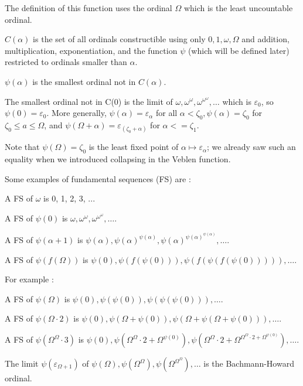 \documentclass[10pt]{article}
\begin{document}
The definition of this function uses the ordinal \( \Omega \) which is the least uncountable ordinal. 

\( C(\alpha) \) is the set of all ordinals constructible using only \( 0, 1, \omega, \Omega \) and addition, multiplication, exponentiation, and the function \( \psi \) (which will be defined later) restricted to ordinals smaller than \( \alpha \).

\( \psi(\alpha) \) is the smallest ordinal not in \( C(\alpha) \). 

The smallest ordinal not in C(0) is the limit of \( \omega, \omega^\omega, \omega^{\omega^\omega}, \ldots \) which is \( \varepsilon_0 \), so \( \psi(0) = \varepsilon_0 \). More generally, \( \psi(\alpha) = \varepsilon_\alpha \) for all \( \alpha < \zeta_0, \psi(\alpha) = \zeta_0 \) for \( \zeta_0 \leq a \leq \Omega \), and \( \psi(\Omega+\alpha) = \varepsilon_(\zeta_0+\alpha) \) for \( \alpha <= \zeta_1 \). 

Note that \( \psi(\Omega) = \zeta_0 \) is the least fixed point of \( \alpha \mapsto \varepsilon_\alpha \); we already saw such an equality when we introduced collapsing in the Veblen function.

Some examples of fundamental sequences (FS) are :

A FS of \( \omega \) is 0, 1, 2, 3, ...

A FS of \( \psi(0) \) is \( \omega, \omega^\omega, \omega^{\omega^\omega}, \ldots \).

A FS of \( \psi(\alpha+1) \) is \( \psi(\alpha), \psi(\alpha)^{\psi(\alpha)}, \psi(\alpha)^{\psi(\alpha)^{\psi(\alpha)}}, \ldots \).

A FS of \( \psi(f(\Omega)) \) is \( \psi(0), \psi(f(\psi(0))), \psi(f(\psi(f(\psi(0))))), \ldots \).

For example :

A FS of \( \psi(\Omega) \) is \( \psi(0), \psi(\psi(0)), \psi(\psi(\psi(0))), \ldots \).

A FS of \( \psi(\Omega \cdot 2) \) is \( \psi(0), \psi(\Omega+\psi(0)), \psi(\Omega+\psi(\Omega+\psi(0))), \ldots \).

A FS of \( \psi(\Omega^\Omega \cdot 3) \) is \( \psi(0), \psi(\Omega^\Omega \cdot 2+\Omega^{\psi(0)}), \psi(\Omega^\Omega \cdot 2+\Omega^{\Omega^\Omega \cdot 2+\Omega^{\psi(0)}}), \ldots \).

\bigskip

The limit \( \psi(\varepsilon_{\Omega+1}) \) of \( \psi(\Omega), \psi(\Omega^\Omega), \psi(\Omega^{\Omega^\Omega}), \ldots \) is the Bachmann-Howard ordinal. 
\end{document}
